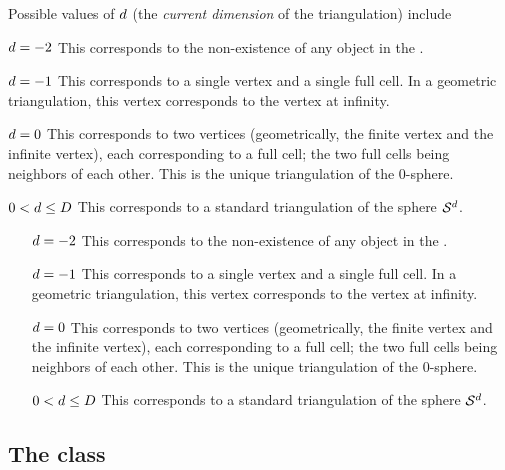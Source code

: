 Possible values of $d$ (the \emph{current dimension} of the triangulation) include
\begin{ccTexOnly}
    \begin{list}{}{\leftmargin=20mm}
    \item[$d=-2$] This corresponds to the non-existence of any object in
        the \tds.
    \item[$d=-1$] This corresponds to a single vertex and a single full cell. In a
        geometric triangulation, this vertex corresponds to the vertex at infinity.
    \item[$d=0$] This corresponds to two vertices (geometrically, the finite vertex and
        the infinite vertex), each corresponding to  a full cell;
        the two full cells being neighbors of each other. This is the unique
        triangulation of the $0$-sphere.
    \item[$0<d\le D$] This corresponds to a standard triangulation of
        the sphere $\mathcal S^{d}$.
    \end{list}
\end{ccTexOnly}
\begin{ccHtmlOnly}
    \begin{itemize}
        \item[$d=-2$] This corresponds to the non-existence of any object in
            the \tds.
        \item[$d=-1$] This corresponds to a single vertex and a single full cell. In a
            geometric triangulation, this vertex corresponds to the vertex at infinity.
        \item[$d=0$] This corresponds to two vertices (geometrically, the finite vertex and
            the infinite vertex), each corresponding to  a full cell;
            the two full cells being neighbors of each other. This is the unique
            triangulation of the $0$-sphere.
        \item[$0<d\le D$] This corresponds to a standard triangulation of
            the sphere $\mathcal S^{d}$.
    \end{itemize}
\end{ccHtmlOnly}


\subsection{The class \label{triangulation:tds:impl}}

